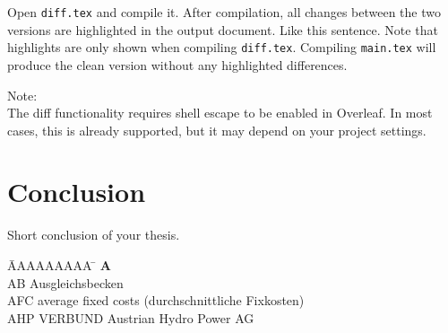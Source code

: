 \documentclass[a4paper, fleqn, headsepline, footsepline, 12pt, parskip=half]{scrartcl}
\begin{document}
Open \texttt{diff.tex} and compile it. After compilation, all changes between the two versions are highlighted in the output document. Like this sentence. Note that highlights are only shown when compiling \texttt{diff.tex}. Compiling \texttt{main.tex} will produce the clean version without any highlighted differences.

Note:\\
The diff functionality requires shell escape to be enabled in Overleaf. In most cases, this is already supported, but it may depend on your project settings.


\newpage
\section{Conclusion}
\label{sec:conclusion}

Short conclusion of your thesis.



\newpage
\pagestyle{myheadings}
\pagestyle{headings}



\begin{tabbing}
	\hspace{0.0cm}  \= AAAAAAAAA \=       \hspace{2cm} \kill
	\> \textbf{A} 	\> \\
	\> AB			\> Ausgleichsbecken\\
	\> AFC     		\> average fixed costs (durchschnittliche Fixkosten)\\
	\> AHP 			\> VERBUND Austrian Hydro Power AG\\
\end{tabbing} 
\end{document}
